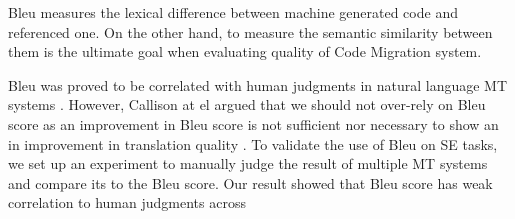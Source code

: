 Bleu measures the lexical difference between machine generated code and referenced one. On the other hand, to measure the semantic similarity between them is the ultimate goal when evaluating quality of Code Migration system. 
 

Bleu was proved to be correlated with human judgments in natural language MT systems \cite {Papineni02}. However, Callison at el argued that we should not over-rely on Bleu score as an improvement in Bleu score is not sufficient nor necessary to show an in improvement in translation quality \cite {Callison06}. To validate the use of Bleu on SE tasks, we set up an experiment to manually judge the result of multiple MT systems and compare its to the Bleu score. Our result showed that Bleu score has weak correlation to human judgments across 



